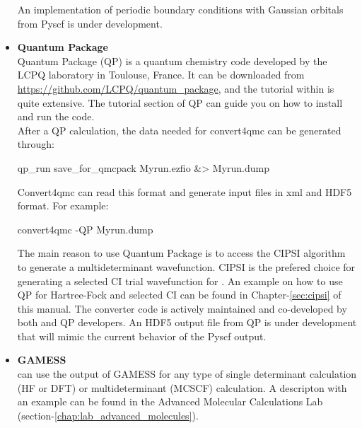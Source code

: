 \begin{itemize}
 An implementation of periodic boundary conditions with Gaussian orbitals from Pyscf is under development. 

\item \textbf{Quantum Package}\\
Quantum Package\cite{QP} (QP) is a quantum chemistry code developed by the LCPQ laboratory in Toulouse, France. It can be downloaded from \url{https://github.com/LCPQ/quantum_package}, and the tutorial within is quite extensive. The tutorial section of QP can guide you on how to install and run the code.\\
After a QP calculation, the data needed for convert4qmc can be generated through:\\
\begin{shade}
 qp_run save_for_qmcpack Myrun.ezfio &> Myrun.dump
\end{shade}

Convert4qmc can read this format and generate \qmcpack input files in xml and HDF5 format.  For example:

\begin{shade}
 convert4qmc -QP Myrun.dump
\end{shade}


The main reason to use Quantum Package is to access the CIPSI algorithm to generate a multideterminant wavefunction.
CIPSI is the prefered choice for generating a selected CI trial wavefunction for \qmcpack.
An example on how to use QP for Hartree-Fock and selected CI can be found in Chapter-\ref{sec:cipsi}  of this manual.
The converter code is actively maintained and co-developed by both \qmcpack and QP developers.
An HDF5 output file from QP is under development that will mimic the current behavior of the Pyscf output.  


\item \textbf{GAMESS}\\
\qmcpack can use the output of GAMESS\cite{schmidt93} for any type of single determinant calculation (HF or DFT) or multideterminant (MCSCF) calculation. A descripton with an example can be found in the Advanced Molecular Calculations Lab (section-\ref{chap:lab_advanced_molecules}).
\end{itemize}

